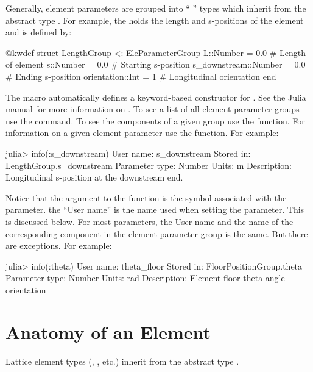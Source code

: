 Generally, element parameters are grouped into ``  '' 
types which inherit from the abstract type .
For example, the  holds the length and s-positions of the element and is defined by:
\begin{example}
  @kwdef struct LengthGroup <: EleParameterGroup
    L::Number = 0.0               # Length of element
    s::Number = 0.0               # Starting s-position
    s_downstream::Number = 0.0    # Ending s-position
    orientation::Int = 1          # Longitudinal orientation
  end
\end{example}
The \vn{\@kwdef} macro automatically defines a keyword-based constructor for .
See the Julia manual for more information on \vn{\@kwdef}. 
To see a list of all element parameter groups use the  command.
To see the components of a given group use the  function. For information on
a given element parameter use the  function. For example:
\begin{example}
  julia> info(:s_downstream)
    User name:       s_downstream
    Stored in:       LengthGroup.s_downstream
    Parameter type:  Number
    Units:           m
    Description:     Longitudinal s-position at the downstream end.
\end{example}
Notice that the argument to the  function is the symbol associated with the parameter.
the ``User name'' is the name used when setting the parameter. This is discussed below. For most
parameters, the User name and the name of the corresponding component in the element parameter
group is the same. But there are exceptions. For example:
\begin{example}
  julia> info(:theta)
    User name:       theta_floor
    Stored in:       FloorPositionGroup.theta
    Parameter type:  Number
    Units:           rad
    Description:     Element floor theta angle orientation
\end{example}

\section{Anatomy of an Element}
\label{s:ele.anatomy}

Lattice element types (, , etc.) inherit from the abstract 
type .

